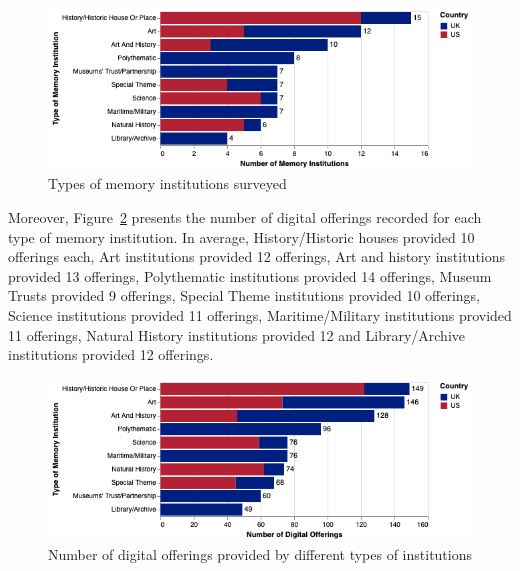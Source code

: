 \documentclass{egpubl}
\begin{document}
\begin{figure}[h]
  \centering
  \includegraphics[width=\linewidth]{images/museumtype.png}
  \caption{\label{fig:MType}
           Types of memory institutions surveyed}
\end{figure}

Moreover, Figure~\ref{fig:typeofferings} presents the number of digital offerings recorded for each type of memory institution. In average, History/Historic houses provided 10 offerings each, Art institutions provided 12 offerings, Art and history institutions provided 13 offerings, Polythematic institutions provided 14 offerings, Museum Trusts provided 9 offerings, Special Theme institutions provided 10 offerings, Science institutions provided 11 offerings, Maritime/Military institutions provided 11 offerings, Natural History institutions provided 12 and Library/Archive institutions provided 12 offerings. 

\begin{figure}[h]
  \centering
  \includegraphics[width=\linewidth]{images/typesoffering.png}
  \caption{\label{fig:typeofferings}
           Number of digital offerings provided by different types of institutions}
\end{figure}
\end{document}
